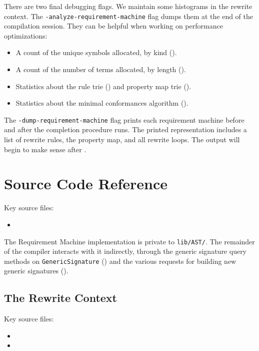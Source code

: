\documentclass[../generics]{subfiles}
\begin{document}
There are two final debugging flags. We maintain some histograms in the rewrite context. The \texttt{-analyze-requirement-machine} flag dumps them at the end of the compilation session. They can be helpful when working on performance optimizations:
\begin{itemize}
\item A count of the unique symbols allocated, by kind ().
\item A count of the number of terms allocated, by length ().
\item Statistics about the rule trie () and property map trie ().
\item Statistics about the minimal conformances algorithm ().
\end{itemize}

The \texttt{-dump-requirement-machine} flag prints each requirement machine before and after the completion procedure runs. The printed representation includes a list of rewrite rules, the property map, and all rewrite loops. The output will begin to make sense after .

\section{Source Code Reference}\label{src:basic operation}

Key source files:
\begin{itemize}
\item {}
\end{itemize}
The Requirement Machine implementation is private to \texttt{lib/AST/}. The remainder of the compiler interacts with it indirectly, through the generic signature query methods on \texttt{GenericSignature} () and the various requests for building new generic signatures ().

\subsection*{The Rewrite Context}

Key source files:
\begin{itemize}
\item {}
\item {}
\end{itemize}
\end{document}
